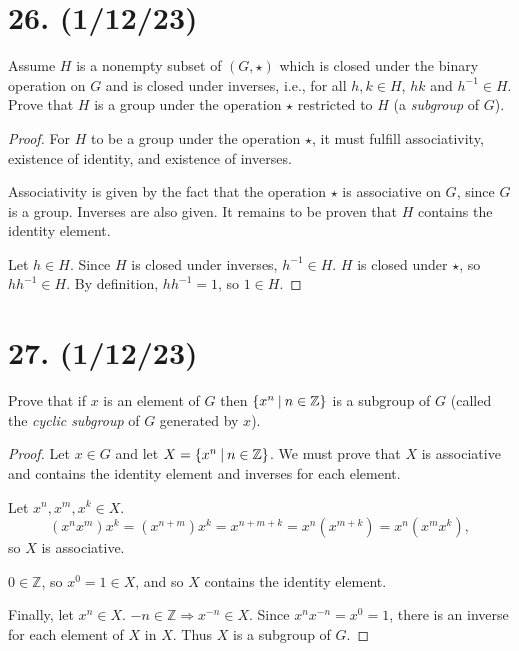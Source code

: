 \documentclass{article}
\begin{document}
\section*{26. (1/12/23)}

Assume $H$ is a nonempty subset of $(G, \star)$ which is closed under the binary operation on $G$ and is closed under inverses, i.e., for all $h, k \in H$, $hk$ and $h^{-1} \in H$. Prove that $H$ is a group under the operation $\star$ restricted to $H$ (a \emph{subgroup} of $G$).

\begin{proof}
      For $H$ to be a group under the operation $\star$, it must fulfill associativity, existence of identity, and existence of inverses.

      Associativity is given by the fact that the operation $\star$ is associative on $G$, since $G$ is a group. Inverses are also given. It remains to be proven that $H$ contains the identity element.

      Let $h \in H$. Since $H$ is closed under inverses, $h^{-1} \in H$. $H$ is closed under $\star$, so $h h^{-1} \in H$. By definition, $h h^{-1} = 1$, so $1 \in H$.
\end{proof}

\section*{27. (1/12/23)}

Prove that if $x$ is an element of $G$ then $\{x^n\hspace{0.5ex}|\hspace{0.5ex}n \in \mathbb{Z}\}$ is a subgroup of $G$ (called the \emph{cyclic subgroup} of $G$ generated by $x$).

\begin{proof}
      Let $x \in G$ and let $X = \{x^n\hspace{0.5ex}|\hspace{0.5ex}n \in \mathbb{Z}\}$. We must prove that $X$ is associative and contains the identity element and inverses for each element.

      Let $x^n, x^m, x^k \in X$. 
      \begin{equation*}
            (x^n x^m) x^k = (x^{n + m}) x^k = x^{n + m + k} = x^n (x^{m + k}) = x^n (x^m x^k),
      \end{equation*}
      so $X$ is associative.

      $0 \in \mathbb{Z}$, so $x^0 = 1 \in X$, and so $X$ contains the identity element.

      Finally, let $x^n \in X$. $-n \in \mathbb{Z} \Rightarrow x^{-n} \in X$. Since $x^n x^{-n} = x^0 = 1$, there is an inverse for each element of $X$ in $X$. Thus $X$ is a subgroup of $G$.
\end{proof}
\end{document}
